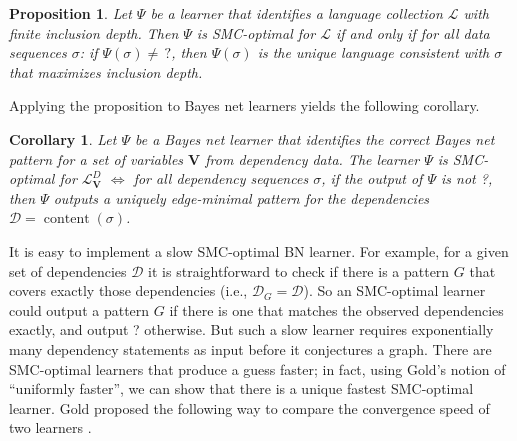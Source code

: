 \documentclass{elsarticle}%
\newtheorem{corollary}[theorem]{Corollary}
\newtheorem{proposition}[theorem]{Proposition}
\DeclareMathOperator{\content}{content}
\renewcommand{\L}{\mathcal{L}}
\newcommand{\VV}{\mathbf{V}}
\newcommand{\D}{\mathcal{D}}
\newcommand{\lvd}{\mathcal{L}^{D}_{\VV}}
\begin{document}
\begin{proposition}
Let $\Psi$ be a learner that identifies a language collection $\L$
with finite inclusion depth. Then $\Psi$ is SMC-optimal for $\L$ if
and only if for all data sequences $\sigma$: if $\Psi(\sigma)\neq\,?$, then
$\Psi(\sigma)$ is the unique language consistent with $\sigma$ that maximizes inclusion depth.
\label{prop:char-smc}
\end{proposition}
%
Applying the proposition to Bayes net learners yields the following corollary.

\begin{corollary}
Let $\Psi$ be a Bayes net learner that identifies the correct Bayes net
pattern for a set of variables $\mathbf{V}$ from dependency data. The learner $\Psi$ is
SMC-optimal for $\lvd$ $\iff$ for all dependency sequences $\sigma$, if the output of
$\Psi$ is not ?, then $\Psi$ outputs %
a uniquely edge-minimal pattern for the
dependencies $\D=\content(\sigma)$.
\end{corollary}
%
It is easy to implement a slow SMC-optimal BN learner. For example, for a given set of dependencies $\D$ it is straightforward to check if there is a pattern $G$ that covers exactly those dependencies (i.e., $\D_G = \D$). So an SMC-optimal learner could output a pattern $G$ if there is one that matches the observed dependencies exactly, and output ? otherwise. But such a slow learner requires exponentially many dependency statements as input before it conjectures a graph. There are SMC-optimal learners that produce a guess faster; in fact, using Gold's notion of ``uniformly faster'', we can show that there is a  unique fastest SMC-optimal learner.
Gold proposed the following way to compare the convergence speed of two learners \cite[p. 462]{gold67limit}. %
\end{document}

